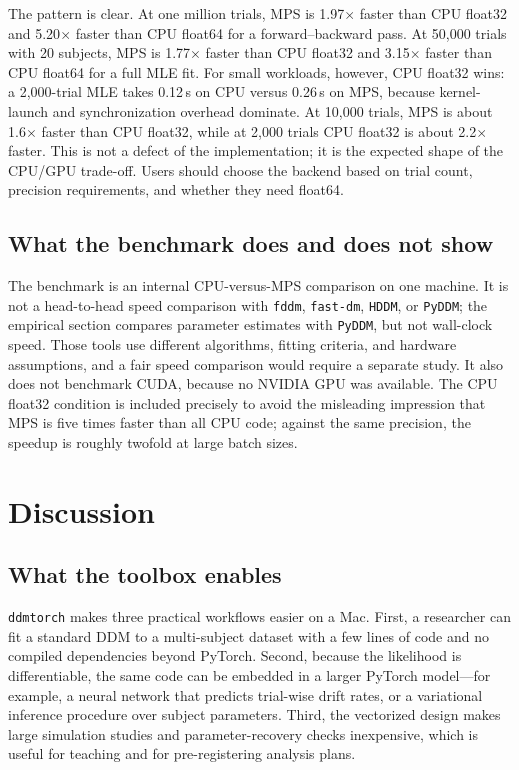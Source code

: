\documentclass[11pt]{article}
\begin{document}
The pattern is clear. At one million trials, MPS is 1.97$\times$ faster than CPU float32 and 5.20$\times$ faster than CPU float64 for a forward--backward pass. At 50,000 trials with 20 subjects, MPS is 1.77$\times$ faster than CPU float32 and 3.15$\times$ faster than CPU float64 for a full MLE fit. For small workloads, however, CPU float32 wins: a 2,000-trial MLE takes 0.12\,s on CPU versus 0.26\,s on MPS, because kernel-launch and synchronization overhead dominate. At 10,000 trials, MPS is about 1.6$\times$ faster than CPU float32, while at 2,000 trials CPU float32 is about 2.2$\times$ faster. This is not a defect of the implementation; it is the expected shape of the CPU/GPU trade-off. Users should choose the backend based on trial count, precision requirements, and whether they need float64.

\subsection{What the benchmark does and does not show}

The benchmark is an internal CPU-versus-MPS comparison on one machine. It is not a head-to-head speed comparison with \texttt{fddm}, \texttt{fast-dm}, \texttt{HDDM}, or \texttt{PyDDM}; the empirical section compares parameter estimates with \texttt{PyDDM}, but not wall-clock speed.  Those tools use different algorithms, fitting criteria, and hardware assumptions, and a fair speed comparison would require a separate study. It also does not benchmark CUDA, because no NVIDIA GPU was available. The CPU float32 condition is included precisely to avoid the misleading impression that MPS is five times faster than all CPU code; against the same precision, the speedup is roughly twofold at large batch sizes.

\section{Discussion}

\subsection{What the toolbox enables}

\texttt{ddmtorch} makes three practical workflows easier on a Mac. First, a researcher can fit a standard DDM to a multi-subject dataset with a few lines of code and no compiled dependencies beyond PyTorch. Second, because the likelihood is differentiable, the same code can be embedded in a larger PyTorch model---for example, a neural network that predicts trial-wise drift rates, or a variational inference procedure over subject parameters. Third, the vectorized design makes large simulation studies and parameter-recovery checks inexpensive, which is useful for teaching and for pre-registering analysis plans.
\end{document}
